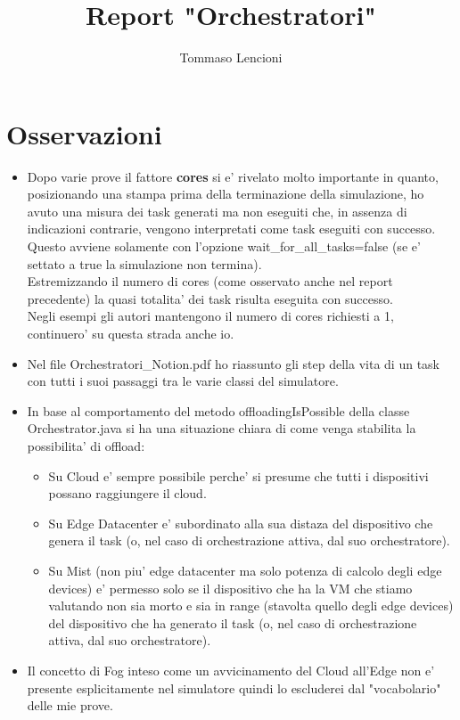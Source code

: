 \documentclass[12pt, a4paper]{report} %
\title{Report "Orchestratori"}
\author{Tommaso Lencioni}
\begin{document}
\section*{Osservazioni}
 \begin{itemize}
 	\item Dopo varie prove il fattore \textbf{cores} si e' rivelato molto importante in quanto, posizionando una stampa prima della terminazione della simulazione, ho avuto una misura dei task generati ma non eseguiti che, in assenza di indicazioni contrarie, vengono interpretati come task eseguiti con successo.\\
 	Questo avviene solamente con l'opzione wait\_for\_all\_tasks=false (se e' settato a true la simulazione non termina).\\
 	Estremizzando il numero di cores (come osservato anche nel report precedente) la quasi totalita' dei task risulta eseguita con successo.\\
 	Negli esempi gli autori mantengono il numero di cores richiesti a 1, continuero' su questa strada anche io.
 	\item Nel file Orchestratori\_Notion.pdf ho riassunto gli step della vita di un task con tutti i suoi passaggi tra le varie classi del simulatore.
 	\item In base al comportamento del metodo offloadingIsPossible della classe Orchestrator.java si ha una situazione chiara di come venga stabilita la possibilita' di offload:
 	\begin{itemize}
 		\item Su Cloud e' sempre possibile perche' si presume che tutti i dispositivi possano raggiungere il cloud.
 		\item Su Edge Datacenter e' subordinato alla sua distaza del dispositivo che genera il task (o, nel caso di orchestrazione attiva, dal suo orchestratore).
 		\item Su Mist (non piu' edge datacenter ma solo potenza di calcolo degli edge devices) e' permesso solo se il dispositivo che ha la VM che stiamo valutando non sia morto e sia in range (stavolta quello degli edge devices) del dispositivo che ha generato il task (o, nel caso di orchestrazione attiva, dal suo orchestratore).
 	\end{itemize}
 	\item Il concetto di Fog inteso come un avvicinamento del Cloud all'Edge non e' presente esplicitamente nel simulatore quindi lo escluderei dal "vocabolario" delle mie prove.

\end{itemize}
\end{document}
